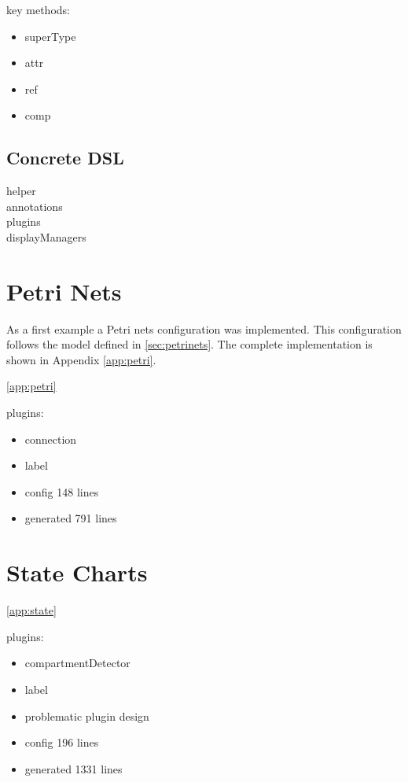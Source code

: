 key methods: 
\begin{itemize}
  \item superType
  \item attr
  \item ref
  \item comp
\end{itemize}

\subsection{Concrete DSL}

\begin{description}
  \item[helper]
  \item[annotations]
  \item[plugins]
  \item[displayManagers]
\end{description}



\section{Petri Nets}
As a first example a Petri nets configuration was implemented. This configuration follows the model defined in \ref{sec:petrinets}. The complete implementation is shown in Appendix \ref{app:petri}.

\ref{app:petri}

plugins:
\begin{itemize}
  \item connection
  \item label
\end{itemize}

\begin{itemize}
  \item config 148 lines
  \item generated 791 lines
\end{itemize}



\section{State Charts}

\ref{app:state}

plugins:
\begin{itemize}
  \item compartmentDetector
  \item label 
\end{itemize}

\begin{itemize}
  \item problematic plugin design
  \item config 196 lines
  \item generated 1331 lines
\end{itemize}
